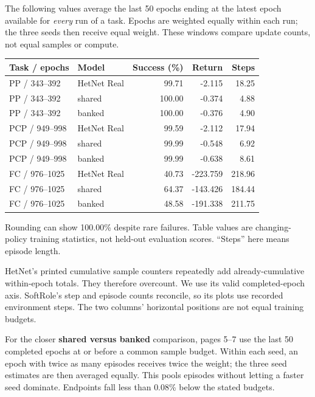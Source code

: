 \documentclass[11pt,letterpaper]{article}
\newcommand{\sub}[1]{\par\vspace{5pt}{\large\bfseries #1}\par\vspace{1pt}}
\newcommand{\captiontext}[1]{\par{\fontsize{9}{11}\selectfont\color{muted}#1\par}}
\begin{document}
\sub{A contextual comparison at the same epoch window}
The following values average the last 50 epochs ending at the latest epoch available for \emph{every} run of a task. Epochs are weighted equally within each run; the three seeds then receive equal weight. These windows compare update counts, not equal samples or compute.
\par{\small\renewcommand{\arraystretch}{1.12}\begin{tabularx}{\linewidth}{@{}p{1.23in}Xrrr@{}}\toprule
Task / epochs & Model & Success (\%) & Return & Steps \\\midrule
PP / 343--392 & HetNet Real & 99.71 & -2.115 & 18.25 \\
PP / 343--392 & shared & 100.00 & -0.374 & 4.88 \\
PP / 343--392 & banked & 100.00 & -0.376 & 4.90 \\
\addlinespace[3pt]
PCP / 949--998 & HetNet Real & 99.59 & -2.112 & 17.94 \\
PCP / 949--998 & shared & 99.99 & -0.548 & 6.92 \\
PCP / 949--998 & banked & 99.99 & -0.638 & 8.61 \\
\addlinespace[3pt]
FC / 976--1025 & HetNet Real & 40.73 & -223.759 & 218.96 \\
FC / 976--1025 & shared & 64.37 & -143.426 & 184.44 \\
FC / 976--1025 & banked & 48.58 & -191.338 & 211.75 \\
\bottomrule
\end{tabularx}}
\captiontext{Rounding can show 100.00\% despite rare failures. Table values are changing-policy training statistics, not held-out evaluation scores. ``Steps'' here means episode length.}

\sub{Why the following plots use two horizontal axes}
HetNet's printed cumulative sample counters repeatedly add already-cumulative within-epoch totals. They therefore overcount. We use its valid completed-epoch axis. SoftRole's step and episode counts reconcile, so its plots use recorded environment steps. The two columns' horizontal positions are not equal training budgets.

For the closer \textbf{shared versus banked} comparison, pages 5--7 use the last 50 completed epochs at or before a common sample budget. Within each seed, an epoch with twice as many episodes receives twice the weight; the three seed estimates are then averaged equally. This pools episodes without letting a faster seed dominate. Endpoints fall less than 0.08\% below the stated budgets.
\end{document}
